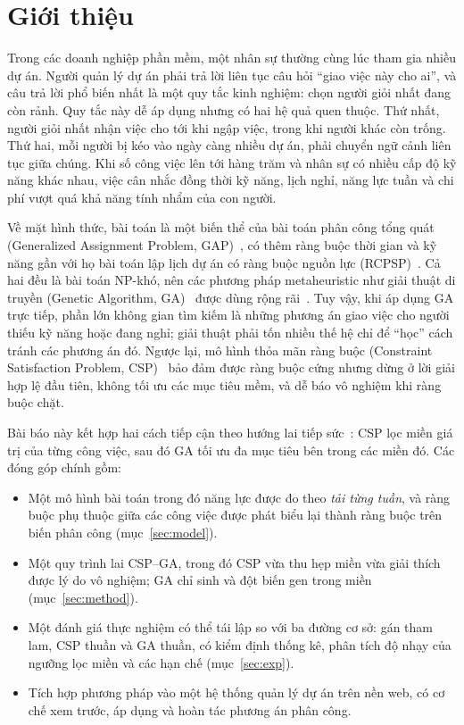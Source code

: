 \documentclass{IEEEtran}
\begin{document}
\section{Giới thiệu}
\label{sec:intro}

Trong các doanh nghiệp phần mềm, một nhân sự thường cùng lúc tham gia nhiều dự án. Người quản lý dự án phải trả lời liên tục câu hỏi ``giao việc này cho ai'', và câu trả lời phổ biến nhất là một quy tắc kinh nghiệm: chọn người giỏi nhất đang còn rảnh. Quy tắc này dễ áp dụng nhưng có hai hệ quả quen thuộc. Thứ nhất, người giỏi nhất nhận việc cho tới khi ngập việc, trong khi người khác còn trống. Thứ hai, mỗi người bị kéo vào ngày càng nhiều dự án, phải chuyển ngữ cảnh liên tục giữa chúng. Khi số công việc lên tới hàng trăm và nhân sự có nhiều cấp độ kỹ năng khác nhau, việc cân nhắc đồng thời kỹ năng, lịch nghỉ, năng lực tuần và chi phí vượt quá khả năng tính nhẩm của con người.

Về mặt hình thức, bài toán là một biến thể của bài toán phân công tổng quát (Generalized Assignment Problem, GAP)~\cite{ross1975}, có thêm ràng buộc thời gian và kỹ năng gần với họ bài toán lập lịch dự án có ràng buộc nguồn lực (RCPSP)~\cite{hartmann2010}. Cả hai đều là bài toán NP-khó, nên các phương pháp metaheuristic như giải thuật di truyền (Genetic Algorithm, GA)~\cite{holland1975,goldberg1989} được dùng rộng rãi~\cite{chu1997,kolisch2006}. Tuy vậy, khi áp dụng GA trực tiếp, phần lớn không gian tìm kiếm là những phương án giao việc cho người thiếu kỹ năng hoặc đang nghỉ; giải thuật phải tốn nhiều thế hệ chỉ để ``học'' cách tránh các phương án đó. Ngược lại, mô hình thỏa mãn ràng buộc (Constraint Satisfaction Problem, CSP)~\cite{russell2020,rossi2006} bảo đảm được ràng buộc cứng nhưng dừng ở lời giải hợp lệ đầu tiên, không tối ưu các mục tiêu mềm, và dễ báo vô nghiệm khi ràng buộc chặt.

Bài báo này kết hợp hai cách tiếp cận theo hướng lai tiếp sức~\cite{talbi2002}: CSP lọc miền giá trị của từng công việc, sau đó GA tối ưu đa mục tiêu bên trong các miền đó. Các đóng góp chính gồm:
\begin{itemize}
  \item Một mô hình bài toán trong đó năng lực được đo theo \emph{tải từng tuần}, và ràng buộc phụ thuộc giữa các công việc được phát biểu lại thành ràng buộc trên biến phân công (mục~\ref{sec:model}).
  \item Một quy trình lai CSP--GA, trong đó CSP vừa thu hẹp miền vừa giải thích được lý do vô nghiệm; GA chỉ sinh và đột biến gen trong miền (mục~\ref{sec:method}).
  \item Một đánh giá thực nghiệm có thể tái lập so với ba đường cơ sở: gán tham lam, CSP thuần và GA thuần, có kiểm định thống kê, phân tích độ nhạy của ngưỡng lọc miền và các hạn chế (mục~\ref{sec:exp}).
  \item Tích hợp phương pháp vào một hệ thống quản lý dự án trên nền web, có cơ chế xem trước, áp dụng và hoàn tác phương án phân công.
\end{itemize}
\end{document}
